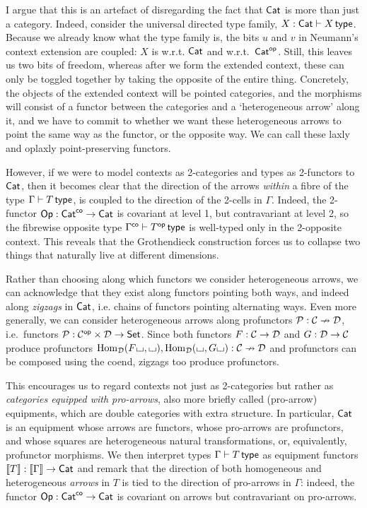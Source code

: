 \documentclass{lmcs} %
\theoremstyle{plain}\newtheorem{satz}[thm]{Satz} %
\theoremstyle{plain}
\theoremstyle{definition}
\begin{document}
I argue that this is an artefact of disregarding the fact that ${\mathsf{Cat}}$ is more than just a category.
Indeed, consider the universal directed type family, $X : {\mathsf{Cat}} \vdash X \,\mathsf{type}$.
Because we already know what the type family is, the bits $u$ and $v$ in Neumann's context extension are coupled: $X$ is \covarfib{} w.r.t. ${\mathsf{Cat}}$ and \contravarfib{} w.r.t.\ ${\mathsf{Cat}}^{\mathsf{op}}$.
Still, this leaves us two bits of freedom, whereas after we form the extended context, these can only be toggled together by taking the opposite of the entire thing.
Concretely, the objects of the extended context will be pointed categories, and the morphisms will consist of a functor between the categories and a `heterogeneous arrow' along it, and we have to commit to whether we want these heterogeneous arrows to point the same way as the functor, or the opposite way.
We can call these laxly and oplaxly point-preserving functors.

However, if we were to model contexts as 2-categories and types as 2-functors to ${\mathsf{Cat}}$, then it becomes clear that the direction of the arrows \emph{within} a fibre of the type $\Gamma \vdash T \,\mathsf{type}$, is coupled to the direction of the 2-cells in $\Gamma$.
Indeed, the 2-functor ${\mathsf{Op}} : {\mathsf{Cat}}^{\mathsf{co}} \to {\mathsf{Cat}}$ is covariant at level 1, but contravariant at level 2, so the fibrewise opposite type $\Gamma^{\mathsf{co}} \vdash T^{\mathsf{op}} \,\mathsf{type}$ is well-typed only in the 2-opposite context.
This reveals that the Grothendieck construction forces us to collapse two things that naturally live at different dimensions.

Rather than choosing along which functors we consider heterogeneous arrows, we can acknowledge that they exist along functors pointing both ways, and indeed along \emph{zigzags} in ${\mathsf{Cat}}$, i.e. chains of functors pointing alternating ways.
Even more generally, we can consider heterogeneous arrows along profunctors ${\mathcal{P}} : {\mathcal{C}} \nrightarrow {\mathcal{D}}$, i.e.\ functors ${\mathcal{P}} : {\mathcal{C}}^{\mathsf{op}} \times {\mathcal{D}} \to {\mathsf{Set}}$.
Since both functors $F : {\mathcal{C}} \to {\mathcal{D}}$ and $G : {\mathcal{D}} \to {\mathcal{C}}$ produce profunctors ${\mathrm{Hom}}_{\mathcal{D}}(F{\llcorner\hspace{-.4ex}\lrcorner}, {\llcorner\hspace{-.4ex}\lrcorner}), {\mathrm{Hom}}_{\mathcal{D}}({\llcorner\hspace{-.4ex}\lrcorner}, G{\llcorner\hspace{-.4ex}\lrcorner}) : {\mathcal{C}} \nrightarrow {\mathcal{D}}$ and profunctors can be composed using the coend, zigzags too produce profunctors.

This encourages us to regard contexts not just as 2-categories but rather as \emph{categories equipped with pro-arrows}, also more briefly called (pro-arrow) equipments, which are double categories with extra structure.
In particular, ${\mathsf{Cat}}$ is an equipment whose arrows are functors, whose pro-arrows are profunctors, and whose squares are heterogeneous natural transformations, or, equivalently, profunctor morphisms.
We then interpret types $\Gamma \vdash T \,\mathsf{type}$ as equipment functors $\mathopen{}\left\llbracket T \right\rrbracket\mathclose{} : \mathopen{}\left\llbracket \Gamma \right\rrbracket\mathclose{} \to {\mathsf{Cat}}$ and remark that the direction of both homogeneous and heterogeneous \emph{arrows} in $T$ is tied to the direction of pro-arrows in $\Gamma$: indeed, the functor ${\mathsf{Op}} : {\mathsf{Cat}}^{\mathsf{co}} \to {\mathsf{Cat}}$ is covariant on arrows but contravariant on pro-arrows.
\end{document}
